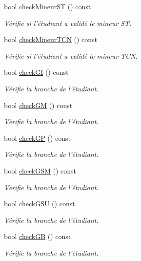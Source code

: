 \begin{DoxyCompactItemize}
bool \hyperlink{class_dossier_a17f062900ee3200dbf39fdc600853e7f}{check\-Mineur\-S\-T} () const 
\begin{DoxyCompactList}\small\item\em Vérifie si l'étudiant a validé le mineur S\-T. \end{DoxyCompactList}\item 
bool \hyperlink{class_dossier_aa2f814f3e4980960cc9c6a0be1f9e090}{check\-Mineur\-T\-C\-N} () const 
\begin{DoxyCompactList}\small\item\em Vérifie si l'étudiant a validé le mineur T\-C\-N. \end{DoxyCompactList}\item 
bool \hyperlink{class_dossier_a2b47261df07a11eb2925d4a2f10d161d}{check\-G\-I} () const 
\begin{DoxyCompactList}\small\item\em Vérifie la branche de l'étudiant. \end{DoxyCompactList}\item 
bool \hyperlink{class_dossier_aaa4bd55702b759f013674027431965e7}{check\-G\-M} () const 
\begin{DoxyCompactList}\small\item\em Vérifie la branche de l'étudiant. \end{DoxyCompactList}\item 
bool \hyperlink{class_dossier_a1de20945ed4b24f32d39a056e93da8d7}{check\-G\-P} () const 
\begin{DoxyCompactList}\small\item\em Vérifie la branche de l'étudiant. \end{DoxyCompactList}\item 
bool \hyperlink{class_dossier_a9467e9e3512b81393af80b47f7f67b10}{check\-G\-S\-M} () const 
\begin{DoxyCompactList}\small\item\em Vérifie la branche de l'étudiant. \end{DoxyCompactList}\item 
bool \hyperlink{class_dossier_a395f52632ee83f26de3943fbec232834}{check\-G\-S\-U} () const 
\begin{DoxyCompactList}\small\item\em Vérifie la branche de l'étudiant. \end{DoxyCompactList}\item 
bool \hyperlink{class_dossier_afb067c27f077ef6c68f87a058e947cd4}{check\-G\-B} () const 
\begin{DoxyCompactList}\small\item\em Vérifie la branche de l'étudiant. \end{DoxyCompactList}\item 

\end{DoxyCompactItemize}
